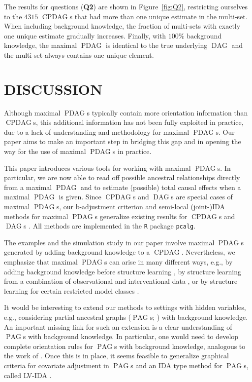 \documentclass[letterpaper]{article}
\theoremstyle{definition}
\theoremstyle{remark}
\DeclareMathOperator{\PDAG}{PDAG}
\DeclareMathOperator{\CPDAG}{CPDAG}
\DeclareMathOperator{\DAG}{DAG}
\DeclareMathOperator{\PAG}{PAG}
\newcommand{\mpdag}{maximal $\PDAG$}
\begin{document}
The results for questions (\textbf{Q2}) are shown in Figure~\ref{fig:Q2},
restricting ourselves to the $4315$ $\CPDAG$s that had more than one
unique estimate in the multi-set.
When including
background knowledge, the fraction of multi-sets with exactly one unique
estimate gradually increases. Finally, with $100\%$ background knowledge,
the \mpdag{} is identical to the true underlying $\DAG$ and the multi-set
always contains one unique element.


\section{DISCUSSION} \label{sec:disc}

Although \mpdag{}s typically contain more
orientation information than $\CPDAG$s, this additional information has not been fully exploited in practice, due to a lack of understanding and methodology for \mpdag{}s. Our paper aims to make an important step in bridging this gap and in opening the way for the use of \mpdag{}s in practice.

This paper introduces various tools for working with \mpdag{}s. In particular, we are now able to read off possible ancestral relationships directly from a \mpdag{} and to estimate (possible) total causal effects when a \mpdag{} is given. Since $\CPDAG$s and $\DAG$s are special cases of \mpdag{}s, our b-adjustment criterion and semi-local (joint-)IDA methods for \mpdag{}s generalize existing results for $\CPDAG$s and $\DAG$s \citep{MaathuisKalischBuehlmann09,shpitser2012validity,perkovic15_uai,perkovic16,
nandy2014estimating}. All methods are implemented in the \texttt{R} package \texttt{pcalg}.

The examples and the simulation study in our paper involve \mpdag{}s generated by adding background knowledge to a $\CPDAG$. Nevertheless, we emphasize that \mpdag{}s can arise in many different ways, e.g., by
adding background knowledge before structure learning \citep{tetrad1998}, by structure learning from a combination of observational and interventional data \citep{hauserBuehlmann12,wang2017permutation}, or by structure learning for certain restricted model classes \citep{hoyer08,ernestroth2016,eigenmann17}.


It would be interesting to extend our methods to settings with hidden variables, e.g., considering partial ancestral graphs ($\PAG$s;  \citealp{richardson2002ancestral,ali2012towards}) with background knowledge. An important missing link for such an extension is a clear understanding of $\PAG$s with background knowledge. In particular, one would need to develop complete orientation rules for $\PAG$s with background knowledge, analogous to the work of \cite{meek1995causal}. Once this is in place, it seems feasible to generalize graphical criteria for covariate adjustment in $\PAG$s \citep{perkovic15_uai,perkovic16} and an IDA type method for $\PAG$s, called LV-IDA \citep{malinsky2017estimating}.
\end{document}
